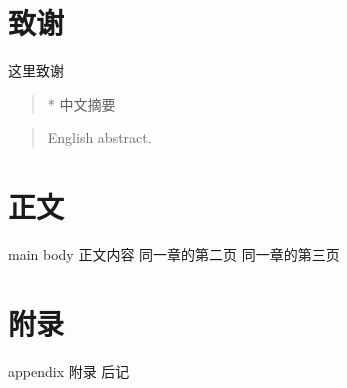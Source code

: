 \documentclass[degree=undergraduate,bibstyle=numerical,font=empty]{xmuthesis}
\begin{document}
\maketitle
\chapter*{致谢}
这里致谢
\begin{abstract}*
    中文摘要
\end{abstract}
\begin{abstract}
    English abstract. 
\end{abstract}
\xmutableofcontents %


\chapter{正文}{main body}
正文内容
\newpage
同一章的第二页
\newpage
同一章的第三页
\nocite{*} 

\appendix
\chapter{附录}{appendix}
附录
\backmatter
后记
\end{document}
